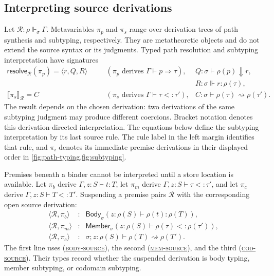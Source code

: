\documentclass[acmsmall,screen,nonacm]{acmart}
\newcommand{\ruleref}[1]{%
  \textsc{(\hyperref[rule:#1]{#1})}}
\newcommand{\resolve}{\Downarrow}
\newcommand{\realizes}{\Vdash}
\newcommand{\coerce}{\mathrel{\rightsquigarrow}}
\newcommand{\bodycl}[5]{%
  \mathsf{Body}_{#1}(#2\!:\!#3\vdash #4:#5)}
\newcommand{\membercl}[5]{%
  \mathsf{Member}_{#1}(#2\!:\!#3\vdash #4<:#5)}
\newcommand{\resolvepi}[2]{\mathsf{resolve}_{#1}(#2)}
\newcommand{\compilepi}[2]{\llbracket #2\rrbracket_{#1}}
\newcommand{\closure}[3]{\langle #1,#2\rangle}
\begin{document}
\subsection{Interpreting source derivations}
\label{sec:coercion-construction}

Let \(\mathcal R:\rho\realizes_\sigma\Gamma\). Metavariables
\(\pi_p\) and \(\pi_s\) range over derivation trees of path synthesis and
subtyping, respectively. They are metatheoretic
objects and do not extend the source syntax or its judgments. Typed path
resolution and subtyping interpretation have signatures
\[
\begin{array}{rcll}
\resolvepi{\mathcal R}{\pi_p}=\langle r,Q,R\rangle
&\quad&(\pi_p\text{ derives }\Gamma\vdash p\Rightarrow\tau),
&
Q:\sigma\vdash\rho(p)\resolve r,
\\[2pt]
&&&R:\sigma\realizes r:\rho(\tau),
\\[2pt]
\compilepi{\mathcal R}{\pi_s}=C
&&(\pi_s\text{ derives }\Gamma\vdash\tau<:\tau'),
&C:\sigma\vdash\rho(\tau)\coerce\rho(\tau').
\end{array}
\]
The result depends on the chosen derivation: two derivations of the same
subtyping judgment may produce different coercions. Bracket notation denotes
this derivation-directed interpretation. The equations below define the
subtyping interpretation by its last source rule.
The rule label in the left margin identifies that rule, and \(\pi_i\) denotes its
immediate premise derivations in their displayed order in
\cref{fig:path-typing,fig:subtyping}.

Premises beneath a binder cannot be interpreted until a store location is
available. Let \(\pi_b\) derive \(\Gamma,z:S\vdash t:T\), let
\(\pi_m\) derive \(\Gamma,z:S\vdash\tau<:\tau'\), and let \(\pi_c\)
derive \(\Gamma,z:S\vdash T<:T'\). Suspending a premise pairs
\(\mathcal R\) with the corresponding open source derivation:
\[
\begin{array}{rcl}
\closure{\mathcal R}{\pi_b}{body}
  &:& \bodycl{\sigma}{z}{\rho(S)}{\rho(t)}{\rho(T)},
\\
\closure{\mathcal R}{\pi_m}{mem}
  &:& \membercl{\sigma}{z}{\rho(S)}{\rho(\tau)}{\rho(\tau')},
\\
\closure{\mathcal R}{\pi_c}{cod}
  &:& \sigma;z:\rho(S)\vdash\rho(T)\coerce\rho(T').
\end{array}
\]
The first line uses \ruleref{body-source}, the second \ruleref{mem-source}, and
the third \ruleref{cod-source}. Their types record whether the suspended
derivation is body typing, member subtyping, or codomain subtyping.
\end{document}
